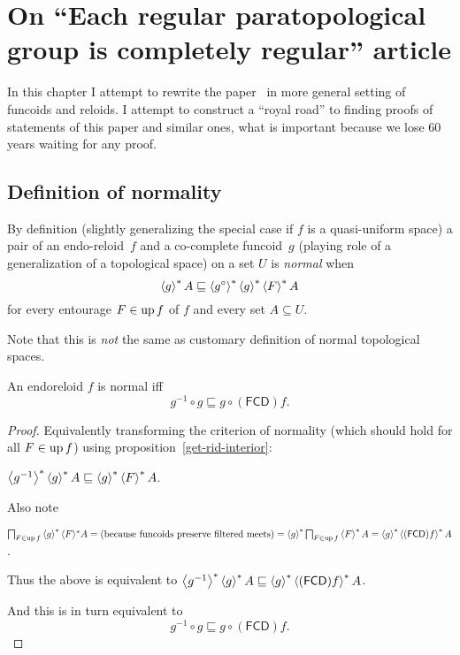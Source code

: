 \chapter{On ``Each regular paratopological group is completely regular'' article}

In this chapter I attempt to rewrite the paper~\cite{2014arXiv1410.1504B} in more general setting of funcoids and reloids.
I attempt to construct a ``royal road'' to finding proofs of statements of this paper and similar ones, what is
important because we lose 60 years waiting for any proof.

\section{Definition of normality}

By definition (slightly generalizing the special case if $f$ is a
quasi-uniform space) a pair of an endo-reloid~$f$ and a co-complete funcoid~$g$ (playing role of a generalization of a topological space)
on a set $U$ is \emph{normal} when
\[ \left\langle g\right\rangle ^{\ast} A \sqsubseteq \left\langle 
g^{\circ}\right\rangle ^{\ast} \left\langle g \right\rangle ^{\ast} \left\langle F\right\rangle ^{\ast} A \] for every entourage $F \in
\operatorname{up} f$ of $f$ and every set $A \subseteq U$.

Note that this is \emph{not} the same as customary definition of normal topological spaces.

\begin{thm}
  An endoreloid $f$ is normal iff
  \[ g^{- 1} \circ g \sqsubseteq
  g \circ (\mathsf{FCD}) f. \]
\end{thm}

\begin{proof}
  Equivalently transforming the criterion of normality (which should hold for
  all $F \in \operatorname{up} f$) using proposition~\ref{get-rid-interior}:

  $\left\langle g^{- 1}\right\rangle ^{\ast}
  \left\langle g\right\rangle ^{\ast} A \sqsubseteq
  \left\langle g\right\rangle ^{\ast} \left\langle F\right\rangle ^{\ast} A$.

  Also note
  
  $\bigsqcap_{F \in \operatorname{up} f} \left\langle  g
  \right\rangle ^{\ast} \langle F \rangle^{\ast} A = \text{(because funcoids preserve
  filtered meets)} = \left\langle  g
  \right\rangle ^{\ast}  \bigsqcap_{F \in \operatorname{up} f} \left\langle F\right\rangle ^{\ast} A =
  \left\langle  g \right\rangle ^{\ast}
  \left\langle  (\mathsf{FCD}) f \right\rangle ^{\ast} A$.

  Thus the above is equivalent to
  $\left\langle g^{-1}\right\rangle ^{\ast}
  \left\langle g\right\rangle ^{\ast} A \sqsubseteq
  \left\langle  g \right\rangle ^{\ast}
  \left\langle  (\mathsf{FCD}) f \right\rangle ^{\ast} A$.

  And this is in turn equivalent to
  \[ g^{-1} \circ g \sqsubseteq
  g \circ (\mathsf{FCD}) f. \]
\end{proof}
